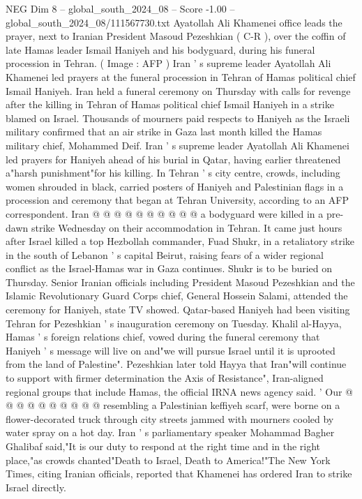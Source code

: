 \begin{textsample}{NEG Dim 8 – global\_south\_2024\_08 – Score -1.00 – global\_south\_2024\_08/111567730.txt}  \label{ex:f8_neg_074}
Ayatollah Ali Khamenei office leads the prayer, next to Iranian President Masoud Pezeshkian ( C-R ), over the coffin of late Hamas leader Ismail Haniyeh and his bodyguard, during his funeral procession in Tehran. ( Image : AFP ) Iran ' s supreme leader Ayatollah Ali Khamenei led prayers at the funeral procession in Tehran of Hamas political chief Ismail Haniyeh.
Iran held a funeral ceremony on Thursday with calls for revenge after the killing in Tehran of Hamas political chief Ismail Haniyeh in a strike blamed on Israel.
Thousands of mourners paid respects to Haniyeh as the Israeli military confirmed that an air strike in Gaza last month killed the Hamas military chief, Mohammed Deif.
Iran ' s supreme leader Ayatollah Ali Khamenei led prayers for Haniyeh ahead of his burial in Qatar, having earlier threatened a"harsh punishment"for his killing.
In Tehran ' s city centre, crowds, including women shrouded in black, carried posters of Haniyeh and Palestinian flags in a procession and ceremony that began at Tehran University, according to an AFP correspondent.
Iran @ @ @ @ @ @ @ @ @ @ a bodyguard were killed in a pre-dawn strike Wednesday on their accommodation in Tehran.
It came just hours after Israel killed a top Hezbollah commander, Fuad Shukr, in a retaliatory strike in the south of Lebanon ' s capital Beirut, raising fears of a wider regional conflict as the Israel-Hamas war in Gaza continues.
Shukr is to be buried on Thursday.
Senior Iranian officials including President Masoud Pezeshkian and the Islamic Revolutionary Guard Corps chief, General Hossein Salami, attended the ceremony for Haniyeh, state TV showed.
Qatar-based Haniyeh had been visiting Tehran for Pezeshkian ' s inauguration ceremony on Tuesday.
Khalil al-Hayya, Hamas ' s foreign relations chief, vowed during the funeral ceremony that Haniyeh ' s message will live on and"we will pursue Israel until it is uprooted from the land of Palestine".
Pezeshkian later told Hayya that Iran"will continue to support with firmer determination the Axis of Resistance", Iran-aligned regional groups that include Hamas, the official IRNA news agency said. ' Our @ @ @ @ @ @ @ @ @ @ resembling a Palestinian keffiyeh scarf, were borne on a flower-decorated truck through city streets jammed with mourners cooled by water spray on a hot day.
Iran ' s parliamentary speaker Mohammad Bagher Ghalibaf said,"It is our duty to respond at the right time and in the right place,"as crowds chanted"Death to Israel, Death to America!"The New York Times, citing Iranian officials, reported that Khamenei has ordered Iran to strike Israel directly.

\end{textsample}
